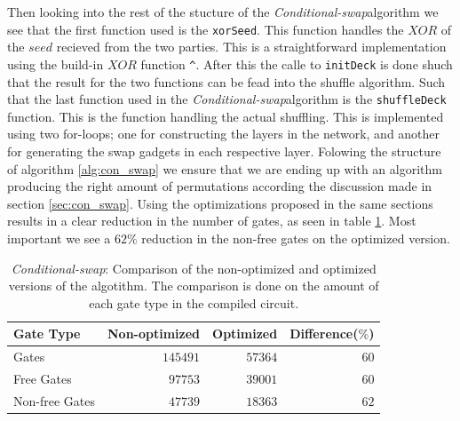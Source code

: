 \documentclass[twoside,11pt,openright]{report}
\newcommand{\CS}{\textit{Conditional-swap}}
\begin{document}
\bigskip

Then looking into the rest of the stucture of the \CS algorithm we see that the first function used is the \verb|xorSeed|. This function handles the $XOR$ of the $seed$ recieved from the two parties. This is a straightforward implementation using the build-in $XOR$ function \verb|^|. After this the calle to \verb|initDeck| is done shuch that the result for the two functions can be fead into the shuffle algorithm. Such that the last function used in the \CS algorithm is the \verb|shuffleDeck| function. This is the function handling the actual shuffling. This is implemented using two for-loops; one for constructing the layers in the network, and another for generating the swap gadgets in each respective layer. Folowing the structure of algorithm \ref{alg:con_swap} we ensure that we are ending up with an algorithm producing the right amount of permutations according the discussion made in section \ref{sec:con_swap}. Using the optimizations proposed in the same sections results in a clear reduction in the number of gates, as seen in table \ref{table:con_swap_comp}. Most important we see a $62\%$ reduction in the non-free gates on the optimized version.

\begin{table}
\centering
\begin{tabular}{l || r r r}
Gate Type      & Non-optimized  & Optimized & Difference($\%$)    \\
\hline
Gates          & $145491$       & $57364$   & $60$ \\
Free Gates     &  $97753$       & $39001$   & $60$ \\
Non-free Gates &  $47739$       & $18363$   & $62$
\end{tabular}
\caption{\CS: Comparison of the non-optimized and optimized versions of the algotithm. The comparison is done on the amount of each gate type in the compiled circuit.}
\label{table:con_swap_comp}
\end{table}

\bigskip
\end{document}
